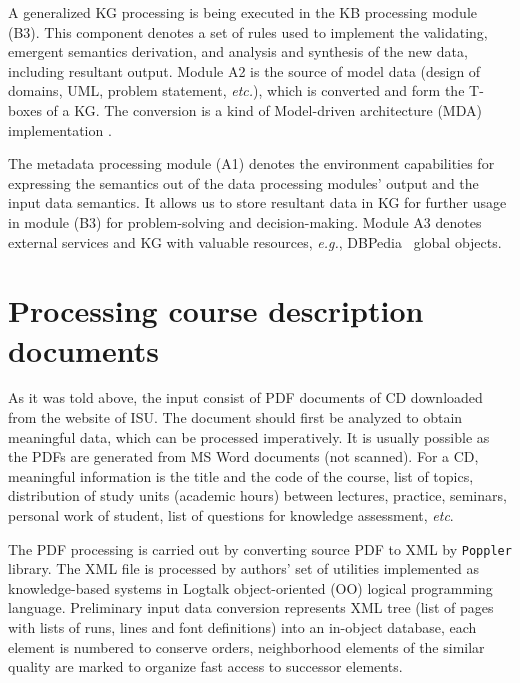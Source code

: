 \documentclass[
]{aiitart}
\begin{document}
A generalized KG processing is being executed in the KB processing module (B3).  This component denotes a set of rules used to implement the validating, emergent semantics derivation, and analysis and synthesis of the new data, including resultant output.  Module A2 is the source of model data (design of domains, UML, problem statement, \emph{etc.}), which is converted and form the T-boxes of a KG.  The conversion is a kind of Model-driven architecture (MDA) implementation \cite{b2}.  %

The metadata processing module (A1) denotes the environment capabilities for expressing the semantics out of the data processing modules' output and the input data semantics.  It allows us to store resultant data in KG for further usage in module (B3) for problem-solving and decision-making.  Module A3 denotes external services and KG with valuable resources, \emph{e.g.}, DBPedia~\cite{b3} global objects.

\section{Processing course description documents}

As it was told above, the input consist of PDF documents of CD downloaded from the website of ISU.  The document should first be analyzed to obtain meaningful data, which can be processed imperatively.  It is usually possible as the PDFs are generated from MS Word documents (not scanned).  For a CD, meaningful information is the title and the code of the course, list of topics, distribution of study units (academic hours) between lectures, practice, seminars, personal work of student, list of questions for knowledge assessment, \emph{etc}.

The PDF processing is carried out by converting source PDF to XML by \verb|Poppler| library.  The XML file is processed by authors' set of utilities implemented as knowledge-based systems in Logtalk \cite{logtalk} object-oriented (OO) logical programming language.  Preliminary input data conversion represents XML tree (list of pages with lists of runs, lines and font definitions) into an in-object database, each element is numbered to conserve orders, neighborhood elements of the similar quality are marked to organize fast access to successor elements.
\end{document}
